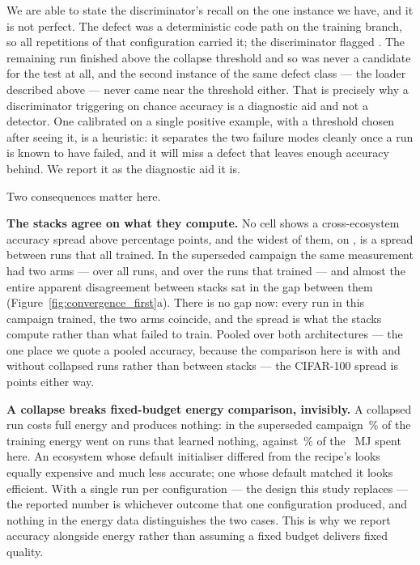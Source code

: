 We are able to state the discriminator's recall on the one instance we have,
and it is not perfect. The defect was a deterministic code path on the training
branch, so all \vRepetitions{} repetitions of that configuration carried it; the
discriminator flagged \vDefectRuns{}. The remaining run finished above the
collapse threshold and so was never a candidate for the test at all, and the
second instance of the same defect class --- the loader described above --- never
came near the threshold either. That is precisely why a discriminator triggering
on chance accuracy is a diagnostic aid and not a detector. One calibrated on a
single positive example, with a threshold chosen after seeing it, is a heuristic:
it separates the two failure modes cleanly once a run is known to have failed,
and it will miss a defect that leaves enough accuracy behind. We report it as the
diagnostic aid it is.

Two consequences matter here.

\textbf{The stacks agree on what they compute.} No cell shows a
cross-ecosystem accuracy spread above \vCondSpreadMax{} percentage points, and
the widest of them, on \vCondBlockName{}, is a spread between runs that all
trained. In the superseded campaign the same measurement had two arms --- over all
runs, and over the runs that trained --- and almost the entire apparent
disagreement between stacks sat in the gap between them
(Figure~\ref{fig:convergence_first}a). There is no gap now: every run in this
campaign trained, the two arms coincide, and the spread is what the stacks
compute rather than what failed to train. Pooled over both architectures ---
the one place we quote a pooled accuracy, because the comparison here is with
and without collapsed runs rather than between stacks --- the CIFAR-100 spread
is \vAccSpreadCifar{} points either way.

\textbf{A collapse breaks fixed-budget energy comparison, invisibly.} A
collapsed run costs full energy and produces nothing: in the superseded campaign
\vCollapseFirstWastedPct\,\% of the training energy went on runs that learned
nothing, against \vWastedPct\,\% of the \vTrainingEnergyMJ~MJ spent here. An
ecosystem whose default initialiser differed from the recipe's looks equally
expensive and much less accurate; one whose default matched it looks efficient.
With a single run per configuration --- the design this study replaces --- the
reported number is whichever outcome that one configuration produced, and
nothing in the energy data distinguishes the two cases. This is why we report
accuracy alongside energy rather than assuming a fixed budget delivers fixed
quality.

